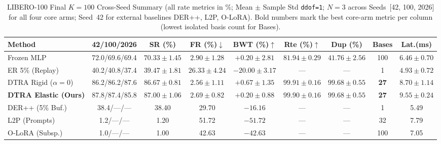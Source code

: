 \documentclass[10pt]{article}
\begin{document}
\begin{table}[ht!]
  \centering
  \caption{LIBERO-100 Final $K=100$ Cross-Seed Summary (all rate metrics in \%; Mean $\pm$ Sample Std \texttt{ddof=1}; $N=3$ across Seeds~[42, 100, 2026] for all four core arms; Seed~42 for external baselines DER++, L2P, O-LoRA). Bold numbers mark the best core-arm metric per column (lowest isolated basis count for Bases).}
  \label{tab:libero100_final}
  \fontsize{7.8pt}{9.6pt}\selectfont
  \setlength{\tabcolsep}{2.6pt}
  \begin{tabular}{lcccccccc}
    \toprule
    \textbf{Method} & \textbf{42/100/2026} & \textbf{SR (\%)} & \textbf{FR (\%)$\downarrow$} & \textbf{BWT (\%)$\uparrow$} & \textbf{Rte (\%)$\uparrow$} & \textbf{Dup (\%)} & \textbf{Bases} & \textbf{Lat.(ms)} \\
    \midrule
    Frozen MLP & 72.0/69.6/69.4 & $70.33 \pm 1.45$ & $2.90 \pm 1.28$ & $+0.20 \pm 2.81$ & $81.94 \pm 0.29$ & $41.76 \pm 2.56$ & 100 & $6.46 \pm 0.70$ \\
    ER 5\% (Replay) & 40.2/40.8/37.4 & $39.47 \pm 1.81$ & $26.33 \pm 4.24$ & $-20.00 \pm 3.17$ & --- & --- & 1 & $\mathbf{4.93 \pm 0.72}$ \\
    DTRA Rigid ($\alpha=0$) & 86.2/86.2/87.6 & $86.67 \pm 0.81$ & $\mathbf{2.56 \pm 1.11}$ & $\mathbf{+0.67 \pm 1.35}$ & $\mathbf{99.91 \pm 0.16}$ & $\mathbf{99.68 \pm 0.55}$ & \textbf{27} & $8.70 \pm 1.14$ \\
    \textbf{DTRA Elastic (Ours)} & 87.8/87.4/85.8 & $\mathbf{87.00 \pm 1.06}$ & $2.69 \pm 0.82$ & $+0.20 \pm 0.88$ & $99.90 \pm 0.16$ & $\mathbf{99.68 \pm 0.55}$ & \textbf{27} & $9.55 \pm 0.24$ \\
    \midrule
    DER++ (5\% Buf.) & 38.4/---/--- & 38.40 & 29.70 & $-16.16$ & --- & --- & 1 & 5.49 \\
    L2P (Prompts) & 1.2/---/--- & 1.20 & 51.72 & $-51.72$ & --- & --- & 32 & 7.79 \\
    O-LoRA (Subsp.) & 1.0/---/--- & 1.00 & 42.63 & $-42.63$ & --- & --- & 100 & 7.05 \\
    \bottomrule
  \end{tabular}
\end{table}
\end{document}
